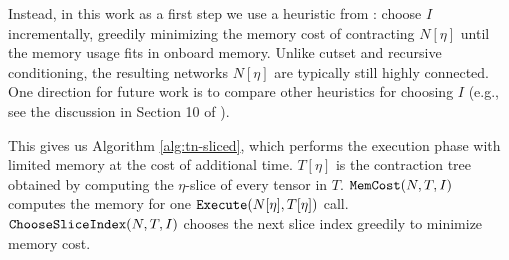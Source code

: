 Instead, in this work as a first step we use a heuristic from \cite{CZHNS18,GK20}: choose $I$ incrementally, greedily minimizing the memory cost of contracting $N[\eta]$ until the memory usage fits in onboard memory. Unlike cutset and recursive conditioning, the resulting networks $N[\eta]$ are typically still highly connected. One direction for future work is to compare other heuristics for choosing $I$ (e.g., see the discussion in Section 10 of \cite{dechter99}).

This gives us Algorithm \ref{alg:tn-sliced}, which performs the execution phase with limited memory at the cost of additional time. $T[\eta]$ is the contraction tree obtained by computing the $\eta$-slice of every tensor in $T$. $\texttt{\upshape MemCost}(N, T, I)$ computes the memory for one $\texttt{\upshape Execute}(N[\eta], T[\eta])$ call. $\texttt{\upshape ChooseSliceIndex}(N,T,I)$ chooses the next slice index greedily to minimize memory cost.

